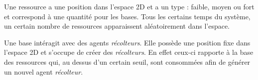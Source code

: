 \documentclass{article}
\begin{document}
Une ressource a une position dans l'espace 2D et a un type : faible, moyen ou fort et
correspond à une quantité pour les bases. Tous les certains temps du système, un certain
nombre de ressources apparaissent aléatoirement dans l'espace.

Une base intéragit avec des agents \emph{récolteurs}. Elle possède une position fixe
dans l'espace 2D et s'occupe de créer des \emph{récolteurs}. En effet ceux-ci rapporte
à la base des ressources qui, au dessus d'un certain seuil, sont consommées afin de
générer un nouvel agent \emph{récolteur}.
\end{document}
